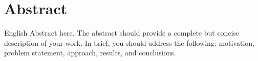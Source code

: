 
\thispagestyle{empty}

\chapter*{Abstract}
English Abstract here. The abstract should provide a complete but concise description of your work. In brief, you should address the following: motivation, problem statement, approach, results, and conclusions. 



